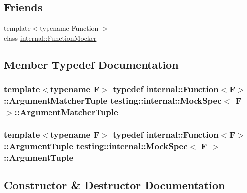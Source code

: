 \subsection*{Friends}
\begin{DoxyCompactItemize}
\item 
{\footnotesize template$<$typename Function $>$ }\\class \hyperlink{classtesting_1_1internal_1_1MockSpec_a6980863fff8693124aff79c507f87d45}{internal\+::\+Function\+Mocker}
\end{DoxyCompactItemize}


\subsection{Member Typedef Documentation}
\subsubsection[{\texorpdfstring{Argument\+Matcher\+Tuple}{ArgumentMatcherTuple}}]{\setlength{\rightskip}{0pt plus 5cm}template$<$typename F$>$ typedef {\bf internal\+::\+Function}$<$F$>$\+::{\bf Argument\+Matcher\+Tuple} {\bf testing\+::internal\+::\+Mock\+Spec}$<$ F $>$\+::{\bf Argument\+Matcher\+Tuple}}\hypertarget{classtesting_1_1internal_1_1MockSpec_a35dc5836483cb8c6882c365c447b26cd}{}\label{classtesting_1_1internal_1_1MockSpec_a35dc5836483cb8c6882c365c447b26cd}
\subsubsection[{\texorpdfstring{Argument\+Tuple}{ArgumentTuple}}]{\setlength{\rightskip}{0pt plus 5cm}template$<$typename F$>$ typedef {\bf internal\+::\+Function}$<$F$>$\+::{\bf Argument\+Tuple} {\bf testing\+::internal\+::\+Mock\+Spec}$<$ F $>$\+::{\bf Argument\+Tuple}}\hypertarget{classtesting_1_1internal_1_1MockSpec_a7d520daca5d4d937578b4c7e8f0cf43e}{}\label{classtesting_1_1internal_1_1MockSpec_a7d520daca5d4d937578b4c7e8f0cf43e}


\subsection{Constructor \& Destructor Documentation}
